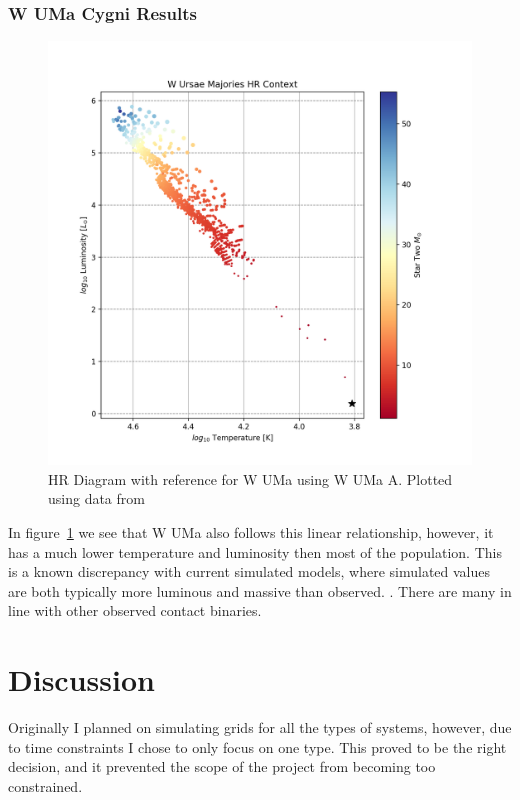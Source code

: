 \documentclass[12pt, a4paper]{article}
\begin{document}
        \subsubsection{W UMa Cygni Results}
            \begin{figure}[H]
                \centering
                \includegraphics[scale = .6]{figs/GeneratedFigs/W_UMa/WUMaHRDiagram.png}
                \caption{HR Diagram with reference for W UMa using W UMa A. Plotted using data from}
                \label{WUMaResults}
            \end{figure}

            In figure~\ref{WUMaResults} we see that W UMa also follows this linear relationship, however, it has a much lower temperature and luminosity then most of the population. This is a known discrepancy with current simulated models, where simulated values are both typically more luminous and massive than observed. \parencite{Fabry_2025}. There are many in line with other observed contact binaries.  



\section{Discussion}   
    Originally I planned on simulating grids for all the types of systems, however, due to time constraints I chose to only focus on one type. This proved to be the right decision, and it prevented the scope of the project from becoming too constrained.
\end{document}
